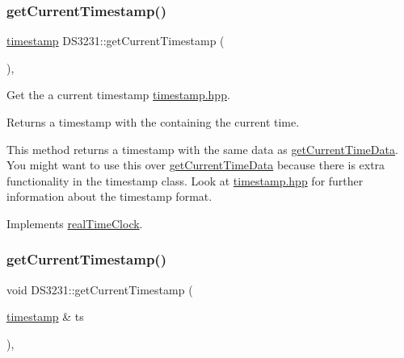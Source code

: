 \subsubsection{\texorpdfstring{get\+Current\+Timestamp()}{getCurrentTimestamp()}\hspace{0.1cm}{\footnotesize\ttfamily [1/2]}}
{\footnotesize\ttfamily \mbox{\hyperlink{classtimestamp}{timestamp}} D\+S3231\+::get\+Current\+Timestamp (\begin{DoxyParamCaption}{ }\end{DoxyParamCaption})\hspace{0.3cm}{\ttfamily [override]}, {\ttfamily [virtual]}}



Get the a current timestamp \mbox{\hyperlink{timestamp_8hpp_source}{timestamp.\+hpp}}. 

\begin{DoxyReturn}{Returns}
a timestamp with the containing the current time.
\end{DoxyReturn}
This method returns a timestamp with the same data as \mbox{\hyperlink{class_d_s3231_a0ca41c2242367c5ff1424d1b12f909c5}{get\+Current\+Time\+Data}}. You might want to use this over \mbox{\hyperlink{class_d_s3231_a0ca41c2242367c5ff1424d1b12f909c5}{get\+Current\+Time\+Data}} because there is extra functionality in the timestamp class. Look at \mbox{\hyperlink{timestamp_8hpp_source}{timestamp.\+hpp}} for further information about the timestamp format. 

Implements \mbox{\hyperlink{classreal_time_clock_a08a7854ef9cef638996a267a953c9b14}{real\+Time\+Clock}}.

\mbox{\label{class_d_s3231_ad94d54ed265fb5b911b4281f0103b0b0}} 
\subsubsection{\texorpdfstring{get\+Current\+Timestamp()}{getCurrentTimestamp()}\hspace{0.1cm}{\footnotesize\ttfamily [2/2]}}
{\footnotesize\ttfamily void D\+S3231\+::get\+Current\+Timestamp (\begin{DoxyParamCaption}\item[{\mbox{\hyperlink{classtimestamp}{timestamp}} \&}]{ts }\end{DoxyParamCaption})\hspace{0.3cm}{\ttfamily [override]}, {\ttfamily [virtual]}}



